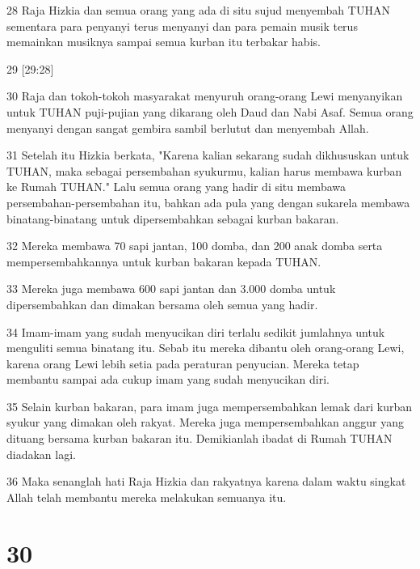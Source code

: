 \par 28 Raja Hizkia dan semua orang yang ada di situ sujud menyembah TUHAN sementara para penyanyi terus menyanyi dan para pemain musik terus memainkan musiknya sampai semua kurban itu terbakar habis.
\par 29 [29:28]
\par 30 Raja dan tokoh-tokoh masyarakat menyuruh orang-orang Lewi menyanyikan untuk TUHAN puji-pujian yang dikarang oleh Daud dan Nabi Asaf. Semua orang menyanyi dengan sangat gembira sambil berlutut dan menyembah Allah.
\par 31 Setelah itu Hizkia berkata, "Karena kalian sekarang sudah dikhususkan untuk TUHAN, maka sebagai persembahan syukurmu, kalian harus membawa kurban ke Rumah TUHAN." Lalu semua orang yang hadir di situ membawa persembahan-persembahan itu, bahkan ada pula yang dengan sukarela membawa binatang-binatang untuk dipersembahkan sebagai kurban bakaran.
\par 32 Mereka membawa 70 sapi jantan, 100 domba, dan 200 anak domba serta mempersembahkannya untuk kurban bakaran kepada TUHAN.
\par 33 Mereka juga membawa 600 sapi jantan dan 3.000 domba untuk dipersembahkan dan dimakan bersama oleh semua yang hadir.
\par 34 Imam-imam yang sudah menyucikan diri terlalu sedikit jumlahnya untuk menguliti semua binatang itu. Sebab itu mereka dibantu oleh orang-orang Lewi, karena orang Lewi lebih setia pada peraturan penyucian. Mereka tetap membantu sampai ada cukup imam yang sudah menyucikan diri.
\par 35 Selain kurban bakaran, para imam juga mempersembahkan lemak dari kurban syukur yang dimakan oleh rakyat. Mereka juga mempersembahkan anggur yang dituang bersama kurban bakaran itu. Demikianlah ibadat di Rumah TUHAN diadakan lagi.
\par 36 Maka senanglah hati Raja Hizkia dan rakyatnya karena dalam waktu singkat Allah telah membantu mereka melakukan semuanya itu.

\chapter{30}

